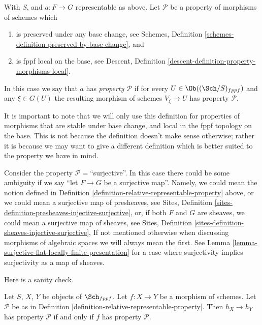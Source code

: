 \begin{definition}
\label{definition-relative-representable-property}
With $S$, and $a : F \to G$ representable as above.
Let $\mathcal{P}$ be a property of morphisms of schemes which
\begin{enumerate}
\item is preserved under any base change,
see Schemes, Definition \ref{schemes-definition-preserved-by-base-change},
and
\item is fppf local on the base, see
Descent, Definition \ref{descent-definition-property-morphisms-local}.
\end{enumerate}
In this case we say that $a$ has {\it property $\mathcal{P}$} if for every
$U \in \Ob((\Sch/S)_{fppf})$ and
any $\xi \in G(U)$ the resulting morphism of schemes
$V_\xi \to U$ has property $\mathcal{P}$.
\end{definition}

\noindent
It is important to note that we will only use this definition for
properties of morphisms that are stable under base change, and
local in the fppf topology on the base. This is
not because the definition doesn't make sense otherwise; rather it
is because we may want to give a different definition which is
better suited to the property we have in mind.

\begin{remark}
\label{remark-warning}
Consider the property $\mathcal{P}=$``surjective''.
In this case there could be some ambiguity if we say
``let $F \to G$ be a surjective map''.
Namely, we could mean the notion defined
in Definition \ref{definition-relative-representable-property}
above, or we could mean a surjective map of presheaves, see
Sites, Definition \ref{sites-definition-presheaves-injective-surjective},
or, if both $F$ and $G$ are sheaves,
we could mean a surjective map of sheaves, see
Sites, Definition \ref{sites-definition-sheaves-injective-surjective},
If not mentioned otherwise when discussing morphisms of algebraic spaces
we will always mean the first. See
Lemma \ref{lemma-surjective-flat-locally-finite-presentation}
for a case where surjectivity implies surjectivity as a map of sheaves.
\end{remark}

\noindent
Here is a sanity check.

\begin{lemma}
\label{lemma-morphism-schemes-gives-representable-transformation-property}
Let $S$, $X$, $Y$ be objects of $\Sch_{fppf}$.
Let $f : X \to Y$ be a morphism of schemes.
Let $\mathcal{P}$ be as in
Definition \ref{definition-relative-representable-property}.
Then $h_X \longrightarrow h_Y$ has property $\mathcal{P}$ if
and only if $f$ has property $\mathcal{P}$.
\end{lemma}

